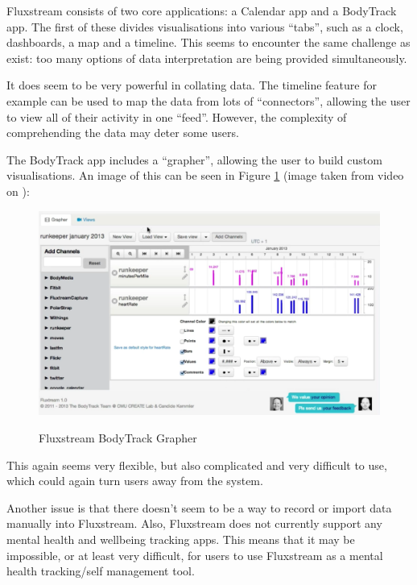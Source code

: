 \documentclass[11pt,openright,a4paper]{report}
\begin{document}
Fluxstream consists of two core applications: a Calendar app and a BodyTrack app. The first of these divides visualisations into various \enquote{tabs}, such as a clock, dashboards, a map and a timeline. This seems to encounter the same challenge as exist: too many options of data interpretation are being provided simultaneously.

It does seem to be very powerful in collating data. The timeline feature for example can be used to map the data from lots of \enquote{connectors}, allowing the user to view all of their activity in one \enquote{feed}. However, the complexity of comprehending the data may deter some users.

The BodyTrack app includes a \enquote{grapher}, allowing the user to build custom visualisations. An image of this can be seen in Figure \ref{fig:fluxstream} (image taken from video on \parencite{fluxstream}):
\begin{figure}[ht]
\centering
\caption{Fluxstream BodyTrack Grapher}
\includegraphics[width=\textwidth]{i/fluxstream.png}
\label{fig:fluxstream}
\end{figure}

This again seems very flexible, but also complicated and very difficult to use, which could again turn users away from the system.

Another issue is that there doesn't seem to be a way to record or import data manually into Fluxstream. Also, Fluxstream does not currently support any mental health and wellbeing tracking apps. This means that it may be impossible, or at least very difficult, for users to use Fluxstream as a mental health tracking/self management tool.

\newpage
\end{document}
